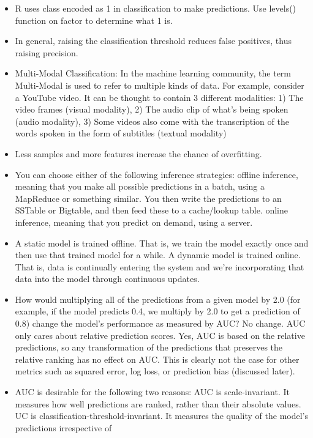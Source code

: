 \documentclass[]{book}
\theoremstyle{definition}
\theoremstyle{definition}
\theoremstyle{definition}
\theoremstyle{remark}
\begin{document}
\begin{itemize}
\item
  R uses class encoded as 1 in classification to make predictions. Use
  levels() function on factor to determine what 1 is.
\item
  In general, raising the classification threshold reduces false
  positives, thus raising precision.
\item
  Multi-Modal Classification: In the machine learning community, the
  term Multi-Modal is used to refer to multiple kinds of data. For
  example, consider a YouTube video. It can be thought to contain 3
  different modalities: 1) The video frames (visual modality), 2) The
  audio clip of what's being spoken (audio modality), 3) Some videos
  also come with the transcription of the words spoken in the form of
  subtitles (textual modality)
\item
  Less samples and more features increase the chance of overfitting.
\item
  You can choose either of the following inference strategies: offline
  inference, meaning that you make all possible predictions in a batch,
  using a MapReduce or something similar. You then write the predictions
  to an SSTable or Bigtable, and then feed these to a cache/lookup
  table. online inference, meaning that you predict on demand, using a
  server.
\item
  A static model is trained offline. That is, we train the model exactly
  once and then use that trained model for a while. A dynamic model is
  trained online. That is, data is continually entering the system and
  we're incorporating that data into the model through continuous
  updates.
\item
  How would multiplying all of the predictions from a given model by 2.0
  (for example, if the model predicts 0.4, we multiply by 2.0 to get a
  prediction of 0.8) change the model's performance as measured by AUC?
  No change. AUC only cares about relative prediction scores. Yes, AUC
  is based on the relative predictions, so any transformation of the
  predictions that preserves the relative ranking has no effect on AUC.
  This is clearly not the case for other metrics such as squared error,
  log loss, or prediction bias (discussed later).
\item
  AUC is desirable for the following two reasons: AUC is
  scale-invariant. It measures how well predictions are ranked, rather
  than their absolute values. UC is classification-threshold-invariant.
  It measures the quality of the model's predictions irrespective of

\end{itemize}
\end{document}
